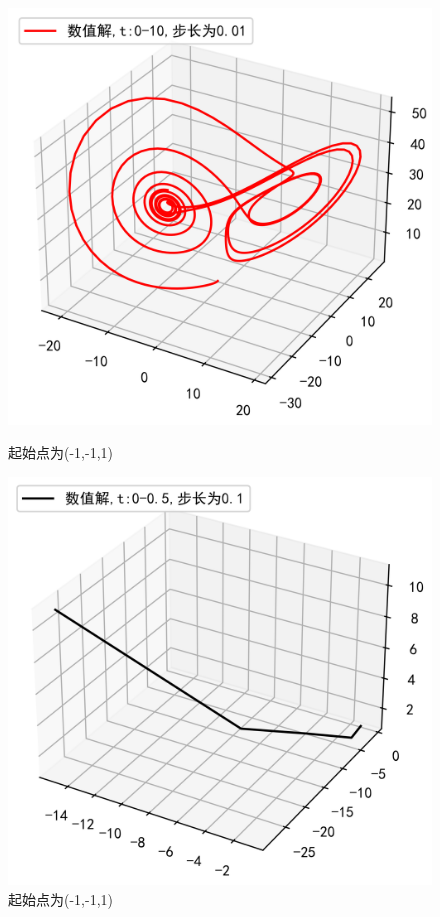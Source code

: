 \documentclass[a4paper]{article}%
\begin{document}
\begin{figure}[h]
    \begin{minipage}[h]{0.48\linewidth}
    \centering
    \includegraphics[scale=0.65]{53}
    \caption{起始点为(-1,-1,1)}
    \end{minipage}
    \begin{minipage}[h]{0.48\linewidth}
    \centering
    \includegraphics[scale=0.65]{54}
    \caption{起始点为(-1,-1,1)}
    \end{minipage}
\end{figure}
\end{document}
